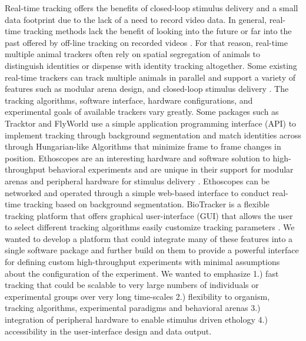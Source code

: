 \documentclass[10pt]{article}
\begin{document}
\begin{multicols}{2}
Real-time tracking offers the benefits of closed-loop stimulus delivery and a small data footprint due to the lack of a need to record video data. In general, real-time tracking methods lack the benefit of looking into the future or far into the past offered by off-line tracking on recorded videos \cite{Itskovits_A_2017}. For that reason, real-time multiple animal trackers often rely on spatial segregation of animals to distinguish identities or dispense with identity tracking altogether\cite{Liu_A_2018}. Some existing real-time trackers can track multiple animals in parallel and support a variety of features such as modular arena design, and closed-loop stimulus delivery \cite{Geissmann_Ethoscopes_2017,Straw_Multi_2011,Stowers_Virtual_2017,Chagas_The_2017}. The tracking algorithms, software interface, hardware configurations, and experimental goals of available trackers vary greatly. Some packages such as Tracktor and FlyWorld use a simple application programming interface (API) to implement tracking through background segmentation and match identities across through Hungarian-like Algorithms that minimize frame to frame changes in position. Ethoscopes are an interesting hardware and software solution to high-throughput behavioral experiments and are unique in their support for modular arenas and peripheral hardware for stimulus delivery \cite{Geissmann_Ethoscopes_2017}. Ethoscopes can be networked and operated through a simple web-based interface to conduct real-time tracking based on background segmentation. BioTracker is a flexible tracking platform that offers graphical user-interface (GUI) that allows the user to select different tracking algorithms easily customize tracking parameters \cite{Mnck_BioTracker_2018}. We wanted to develop a platform that could integrate many of these features into a single software package and further build on them to provide a powerful interface for defining custom high-throughput experiments with minimal assumptions about the configuration of the experiment. We wanted to emphasize 1.) fast tracking that could be scalable to very large numbers of individuals or experimental groups over very long time-scales 2.) flexibility to organism, tracking algorithms, experimental paradigms and behavioral arenas 3.) integration of peripheral hardware to enable stimulus driven ethology 4.) accessibility in the user-interface design and data output. 


\end{multicols}
\end{document}
